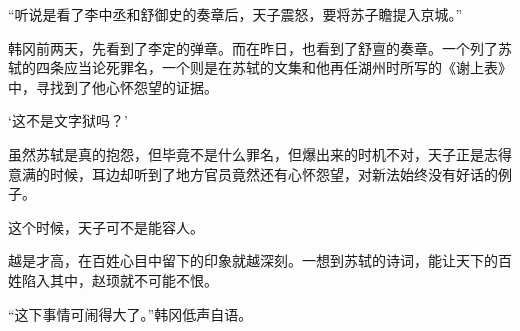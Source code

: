 “听说是看了李中丞和舒御史的奏章后，天子震怒，要将苏子瞻提入京城。”

韩冈前两天，先看到了李定的弹章。而在昨日，也看到了舒亶的奏章。一个列了苏轼的四条应当论死罪名，一个则是在苏轼的文集和他再任湖州时所写的《谢上表》中，寻找到了他心怀怨望的证据。

‘这不是文字狱吗？’

虽然苏轼是真的抱怨，但毕竟不是什么罪名，但爆出来的时机不对，天子正是志得意满的时候，耳边却听到了地方官员竟然还有心怀怨望，对新法始终没有好话的例子。

这个时候，天子可不是能容人。

越是才高，在百姓心目中留下的印象就越深刻。一想到苏轼的诗词，能让天下的百姓陷入其中，赵顼就不可能不恨。

“这下事情可闹得大了。”韩冈低声自语。

